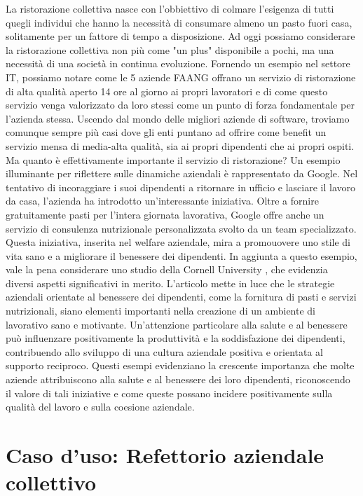 \documentclass[a4paper, titlepage, 12pt, openright, twoside]{book}
\begin{document}
La ristorazione collettiva nasce con l'obbiettivo di colmare l'esigenza di tutti quegli individui
che hanno la necessità di consumare almeno un pasto fuori casa, solitamente per un fattore di tempo a disposizione.
Ad oggi possiamo considerare la ristorazione collettiva non più come "un plus" disponibile a pochi, ma una necessità di una società in continua evoluzione.
Fornendo un esempio nel settore IT, possiamo notare come le 5 aziende FAANG offrano un servizio di ristorazione di alta qualità aperto 14 ore al giorno ai propri lavoratori
e di come questo servizio venga valorizzato da loro stessi come un punto di forza fondamentale per l'azienda stessa.
\newline
Uscendo dal mondo delle migliori aziende di software, troviamo comunque sempre più casi dove gli enti puntano ad offrire come benefit un servizio mensa di media-alta qualità,
sia ai propri dipendenti che ai propri ospiti.
\newline
Ma quanto è effettivamente importante il servizio di ristorazione?
\newline
Un esempio illuminante per riflettere sulle dinamiche aziendali è rappresentato da Google. Nel tentativo di incoraggiare i suoi dipendenti a ritornare in ufficio e lasciare il lavoro da casa, l'azienda ha introdotto un'interessante iniziativa. Oltre a fornire gratuitamente pasti per l'intera giornata lavorativa, Google offre anche un servizio di consulenza nutrizionale personalizzata svolto da un team specializzato. Questa iniziativa, inserita nel welfare aziendale, mira a promouovere uno stile di vita sano e a migliorare il benessere dei dipendenti.
In aggiunta a questo esempio, vale la pena considerare uno studio della Cornell University \cite{cornell}, che evidenzia diversi aspetti significativi in merito. L'articolo mette in luce che le strategie aziendali orientate al benessere dei dipendenti, come la fornitura di pasti e servizi nutrizionali, siano elementi importanti nella creazione di un ambiente di lavorativo sano e motivante. Un'attenzione particolare alla salute e al benessere può influenzare positivamente la produttività e la soddisfazione dei dipendenti, contribuendo allo sviluppo di una cultura aziendale positiva e orientata al supporto reciproco. Questi esempi evidenziano la crescente importanza che molte aziende attribuiscono alla salute e al benessere dei loro dipendenti, riconoscendo il valore di tali iniziative e come queste possano incidere positivamente sulla qualità del lavoro e sulla coesione aziendale.

\chapter{Caso d'uso: Refettorio aziendale collettivo}\label{chap:caso}
\end{document}
